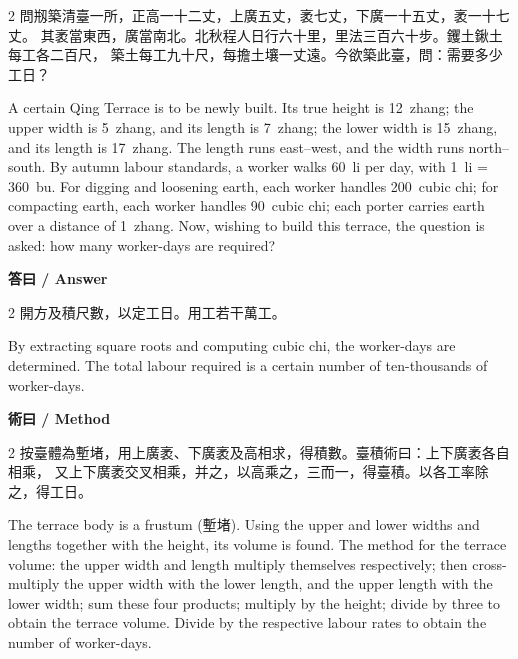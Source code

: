 \documentclass[11pt,a4paper]{article}
\begin{document}
\begin{paracol}{2}
問剏築清臺一所，正高一十二丈，上廣五丈，袤七丈，下廣一十五丈，袤一十七丈。
其袤當東西，廣當南北。北秋程人日行六十里，里法三百六十步。钁土鍬土每工各二百尺，
築土每工九十尺，每擔土壤一丈遠。今欲築此臺，問：需要多少工日？

\switchcolumn

A certain Qing Terrace is to be newly built. Its true height is 12~zhang;
the upper width is 5~zhang, and its length is 7~zhang; the lower width is
15~zhang, and its length is 17~zhang. The length runs east--west, and the
width runs north--south. By autumn labour standards, a worker walks 60~li
per day, with 1~li = 360~bu. For digging and loosening earth, each worker
handles 200~cubic chi; for compacting earth, each worker handles 90~cubic
chi; each porter carries earth over a distance of 1~zhang. Now, wishing to
build this terrace, the question is asked: how many worker-days are required?

\end{paracol}

\vspace{0.4em}

\noindent\textbf{\textcolor{chinesecolor}{答曰} / \textcolor{englishcolor}{Answer}}

\vspace{0.2em}

\begin{paracol}{2}
開方及積尺數，以定工日。用工若干萬工。

\switchcolumn

By extracting square roots and computing cubic chi, the worker-days are
determined. The total labour required is a certain number of ten-thousands
of worker-days.

\end{paracol}

\vspace{0.4em}

\noindent\textbf{\textcolor{chinesecolor}{術曰} / \textcolor{englishcolor}{Method}}

\vspace{0.2em}

\begin{paracol}{2}
按臺體為塹堵，用上廣袤、下廣袤及高相求，得積數。臺積術曰：上下廣袤各自相乘，
又上下廣袤交叉相乘，并之，以高乘之，三而一，得臺積。以各工率除之，得工日。

\switchcolumn

The terrace body is a frustum (塹堵). Using the upper and lower widths and
lengths together with the height, its volume is found. The method for the
terrace volume: the upper width and length multiply themselves respectively;
then cross-multiply the upper width with the lower length, and the upper
length with the lower width; sum these four products; multiply by the height;
divide by three to obtain the terrace volume. Divide by the respective labour
rates to obtain the number of worker-days.

\end{paracol}
\end{document}
